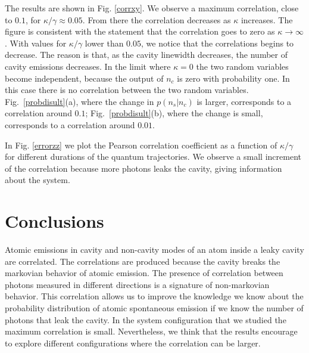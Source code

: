\documentclass[%
 reprint,
 amsmath,amssymb,
 aps, 
]{revtex4-1}
\begin{document}

The results are shown in Fig. \ref{corrxy}. We observe a maximum
correlation, close to $0.1$, for $\kappa/\gamma\approx 0.05$. From
there the correlation decreases as $\kappa$ increases. The figure is
consistent with the statement that the correlation goes to zero as
$\kappa\rightarrow\infty$. With values for $\kappa/\gamma$ lower than
$0.05$, we notice that the correlations begins to decrease. The reason
is that, as the cavity linewidth decreases, the number of cavity
emissions decreases. In the limit where $\kappa=0$ the two random
variables become independent, because the output of $n_c$ is zero
with probability one. In this case there is no correlation between the
two random variables. Fig.~\ref{probdisult}(a), where the change in
$p(n_s|n_c)$ is larger, corresponds to a correlation around $0.1$;
Fig.~\ref{probdisult}(b), where the change is small, corresponds to a
correlation around $0.01$.


In Fig. \ref{errorzz} we plot the Pearson correlation coefficient as a
function of $\kappa/\gamma$ for different durations of the quantum
trajectories. We observe a small increment of the correlation
because more photons leaks the cavity, giving information about the
system.


\section{Conclusions}\label{sc:conclusions}
Atomic emissions in cavity and non-cavity modes of an atom inside a
leaky cavity are correlated. The correlations are produced because the
cavity breaks the markovian behavior of atomic emission. The presence
of correlation between photons measured in different directions is a
signature of non-markovian behavior. This correlation allows us to
improve the knowledge we know about the probability distribution of
atomic spontaneous emission if we know the number of photons that leak
the cavity. In the system configuration that we studied the maximum
correlation is small. Nevertheless, we think that the results
encourage to explore different configurations where the correlation
can be larger.
\end{document}
